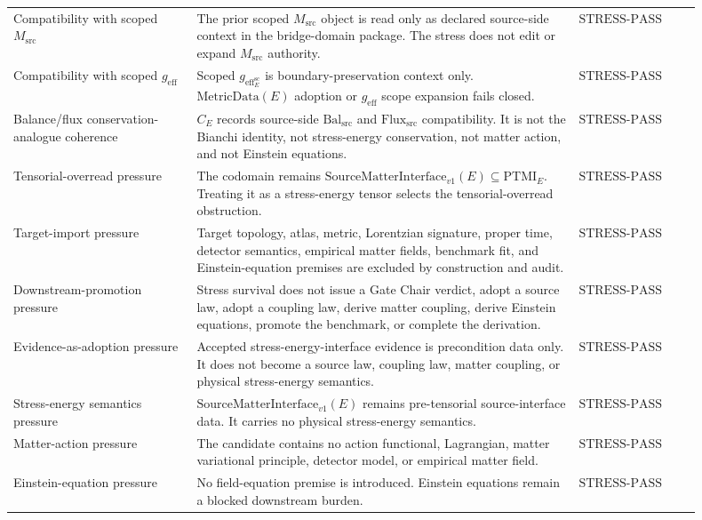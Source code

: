 \documentclass[11pt]{article}
\newcommand{\MetricData}{\mathrm{MetricData}}
\newcommand{\geff}{g_{\mathrm{eff}}}
\newcommand{\Msrc}{M_{\mathrm{src}}}
\newcommand{\SMI}{\mathrm{SourceMatterInterface}_{v1}}
\newcommand{\PTMI}{\mathrm{PTMI}}
\newcommand{\StressPass}{\mathrm{STRESS}\mbox{-}\mathrm{PASS}}
\begin{document}
\begin{longtable}{p{0.24\linewidth}p{0.50\linewidth}p{0.16\linewidth}}
\addlinespace
Compatibility with scoped \(\Msrc\) &
The prior scoped \(\Msrc\) object is read only as declared source-side
context in the bridge-domain package. The stress does not edit or expand
\(\Msrc\) authority. & \(\StressPass\) \\
\addlinespace
Compatibility with scoped \(\geff\) &
Scoped \(\geff_E^{\mathrm{sc}}\) is boundary-preservation context only.
\(\MetricData(E)\) adoption or \(\geff\) scope expansion fails closed. &
\(\StressPass\) \\
\addlinespace
Balance/flux conservation-analogue coherence &
\(C_E\) records source-side \(\mathrm{Bal}_{\mathrm{src}}\) and
\(\mathrm{Flux}_{\mathrm{src}}\) compatibility. It is not the Bianchi
identity, not stress-energy conservation, not matter action, and not Einstein
equations. & \(\StressPass\) \\
\addlinespace
Tensorial-overread pressure &
The codomain remains \(\SMI(E)\subseteq\PTMI_E\). Treating it as a
stress-energy tensor selects the tensorial-overread obstruction. &
\(\StressPass\) \\
\addlinespace
Target-import pressure &
Target topology, atlas, metric, Lorentzian signature, proper time, detector
semantics, empirical matter fields, benchmark fit, and Einstein-equation
premises are excluded by construction and audit. & \(\StressPass\) \\
\addlinespace
Downstream-promotion pressure &
Stress survival does not issue a Gate Chair verdict, adopt a source law,
adopt a coupling law, derive matter coupling, derive Einstein equations,
promote the benchmark, or complete the derivation. & \(\StressPass\) \\
\addlinespace
Evidence-as-adoption pressure &
Accepted stress-energy-interface evidence is precondition data only. It does
not become a source law, coupling law, matter coupling, or physical
stress-energy semantics. & \(\StressPass\) \\
\addlinespace
Stress-energy semantics pressure &
\(\SMI(E)\) remains pre-tensorial source-interface data. It carries no
physical stress-energy semantics. & \(\StressPass\) \\
\addlinespace
Matter-action pressure &
The candidate contains no action functional, Lagrangian, matter variational
principle, detector model, or empirical matter field. & \(\StressPass\) \\
\addlinespace
Einstein-equation pressure &
No field-equation premise is introduced. Einstein equations remain a blocked
downstream burden. & \(\StressPass\) \\
\bottomrule
\end{longtable}
\end{document}
